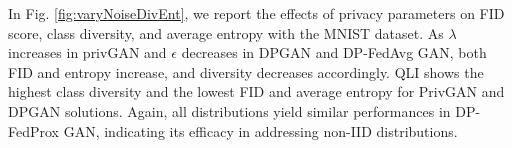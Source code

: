 \documentclass[conference]{IEEEtran}
\begin{document}
 In Fig. \ref{fig:varyNoiseDivEnt}, we report the effects of privacy parameters on FID score, class diversity, and average entropy with the MNIST dataset.  As $\lambda$ increases in privGAN  and $\epsilon$ decreases in DPGAN and DP-FedAvg GAN, both FID  and entropy increase, and diversity decreases accordingly.  QLI shows the highest class diversity and the lowest FID and average entropy for PrivGAN and DPGAN solutions. Again, all distributions yield similar performances in DP-FedProx GAN, indicating its efficacy in addressing non-IID distributions.
 




 

 

 
\end{document}
